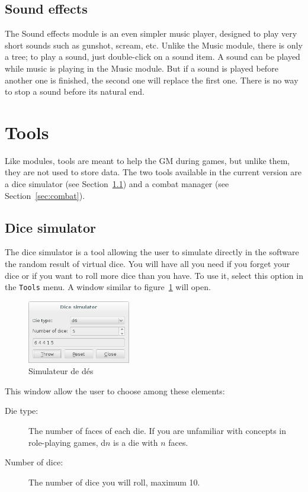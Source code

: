 \documentclass[a4paper,12pt]{article}
\newcommand*{\interfaceitem}[1]{\texttt{#1}}
\begin{document}
\subsection{Sound effects}
\label{sec:fx}

The Sound effects module is an even simpler music player, designed to play very short sounds such as gunshot, scream, etc. Unlike the Music module, there is only a tree; to play a sound, just double-click on a sound item.
A sound can be played while music is playing in the Music module. But if a sound is played before another one is finished, the second one will replace the first one.
There is no way to stop a sound before its natural end.


\section{Tools}
\label{sec:tools}
Like modules, tools are meant to help the GM during games, but unlike them, they are not used to store data. The two tools available in the current version are a dice simulator (see Section~\ref{sec:dice}) and a combat manager (see Section~\ref{sec:combat}).

\subsection{Dice simulator}
\label{sec:dice}

The dice simulator is a tool allowing the user to simulate directly in the software the random result of virtual dice. You will have all you need if you forget your dice or if you want to roll more dice than you have. To use it, select this option in the \interfaceitem{Tools} menu. A window similar to figure~\ref{simulateur_des} will open.
\begin{figure}[ht]
    \centerline{\includegraphics[width=0.4\textwidth]{dice_simulator}}
    \caption{Simulateur de dés}
    \label{simulateur_des}
\end{figure}

This window allow the user to choose among these elements:
\begin{description}
    \item[Die type:]{The number of faces of each die. If you are unfamiliar with concepts in role-playing games, d$n$ is a die with $n$ faces.}
    \item[Number of dice:]{The number of dice you will roll, maximum 10.}
\end{description}
\end{document}

